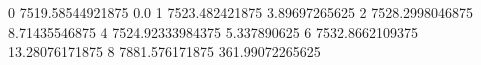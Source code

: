 0 7519.58544921875 0.0
1 7523.482421875 3.89697265625
2 7528.2998046875 8.71435546875
4 7524.92333984375 5.337890625
6 7532.8662109375 13.28076171875
8 7881.576171875 361.99072265625
